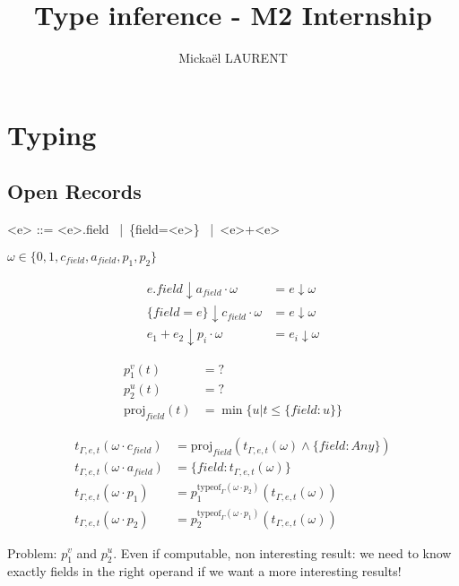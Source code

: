 \documentclass[a4paper]{article}%
\title{\vspace{1.5cm}Type inference - M2 Internship}
\author{Mickaël LAURENT}
\date{\vspace{-5ex}}
\newcommand{\alt}{~|~}
\begin{document}
	\maketitle

    \section{Typing}

    \subsection{Open Records}

    \begin{grammar}
        \let\syntleft\relax
        \let\syntright\relax
        <e> ::= <e>.field \alt \{field=<e>\} \alt <e>+<e>
    \end{grammar}

    $ \omega \in \{0,1,c_{field},a_{field},p_1,p_2\} $

    \begin{align*} 
        e.field \downarrow a_{field}\cdot\omega & = e \downarrow \omega\\
        \{field=e\} \downarrow c_{field}\cdot\omega & = e \downarrow \omega\\
        e_1 + e_2 \downarrow p_i \cdot \omega & = e_i \downarrow \omega
    \end{align*}

    \begin{align*}
        p_1^v(t) &= ?\\
        p_2^u(t) &= ?\\
        \text{proj}_{field}(t) &= \min\{u | t \leq \{field:u\}\}
    \end{align*}

    \begin{align*}
        t_{\Gamma,e,t}(\omega\cdot c_{field}) &= \text{proj}_{field}(t_{\Gamma,e,t}(\omega) \land \{field:Any\})\\
        t_{\Gamma,e,t}(\omega\cdot a_{field}) &= \{ field: t_{\Gamma,e,t}(\omega) \}\\
        t_{\Gamma,e,t}(\omega\cdot p_1) &=  p_1^{\text{typeof}_{\Gamma}(\omega\cdot p_2)}(t_{\Gamma,e,t}(\omega))\\
        t_{\Gamma,e,t}(\omega\cdot p_2) &=  p_2^{\text{typeof}_{\Gamma}(\omega\cdot p_1)}(t_{\Gamma,e,t}(\omega))
    \end{align*}

    Problem: $p_1^v$ and $p_2^u$. Even if computable, non interesting result: we need to know exactly fields in the right operand
    if we want a more interesting results!
\end{document}
